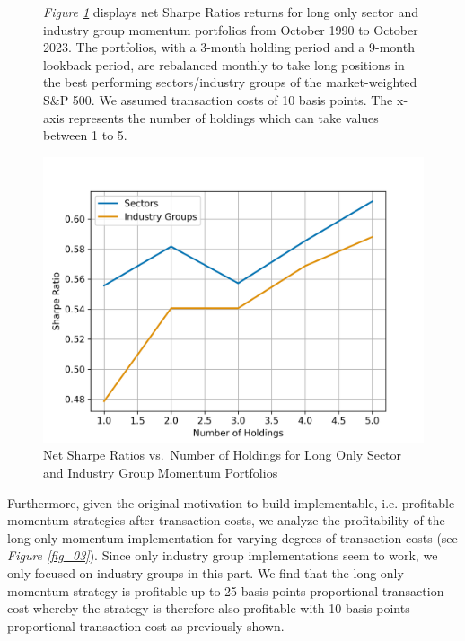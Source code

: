 \documentclass[a4paper,12pt,twoside]{article}
\begin{document}
\begin{figure}[H] 
       \captionsetup{justification=centering}
    \caption{Net Sharpe Ratios vs.~Number of Holdings for Long Only Sector and Industry Group Momentum Portfolios} 
    \label{fig_04}
        \textit{Figure \ref{fig_04}} displays net Sharpe Ratios returns for long only sector and industry group momentum portfolios from October 1990 to October 2023. The portfolios, with a 3-month holding period and a 9-month lookback period, are rebalanced monthly to take long positions in the best performing sectors/industry groups of the market-weighted S\&P 500. We assumed transaction costs of 10 basis points. The x-axis represents the number of holdings which can take values between 1 to 5.
    \centerline{\includegraphics[width=1\textwidth]{Plots/robustness_check_holdings.png}}
\end{figure}


\newpage
Furthermore, given the original motivation to build implementable, i.e. profitable momentum strategies after transaction costs, we analyze the profitability of the long only momentum implementation for varying degrees of transaction costs (see \textit{Figure \ref{fig_03}}). Since only industry group implementations seem to work, we only focused on industry groups in this part. We find that the long only momentum strategy is profitable up to 25 basis points proportional transaction cost whereby the strategy is therefore also profitable with 10 basis points proportional transaction cost as previously shown.\\
\end{document}
